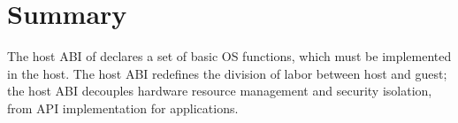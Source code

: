 \section{Summary}
\label{sec:abi:summary}

The host ABI of \graphene{}
declares a set of basic OS functions, which must be implemented in the host.
The host ABI redefines the division of labor
between host and guest;
the host ABI decouples hardware resource management and security isolation,
from API implementation for applications.
